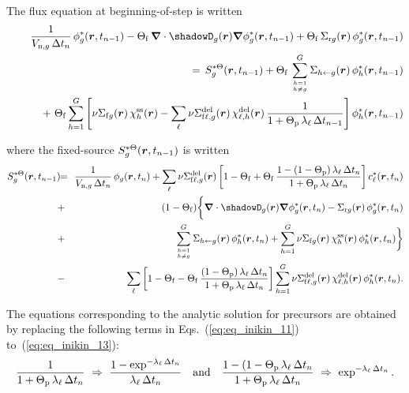 \goodbreak
The flux equation at beginning-of-step is written
\begin{eqnarray}
\nonumber&~&{1\over V_{{\rm n},g}\, \Delta t_n} \, \phi^*_g(\bff(r),t_{n-1}) - \Theta_{\rm f} \, \bff(\nabla) \cdot \shadowD_g(\bff(r)) \bff(\nabla) \phi^*_g(\bff(r),t_{n-1}) + \Theta_{\rm f} \, \Sigma_{{\rm r}g}(\bff(r)) \, \phi^*_g(\bff(r),t_{n-1}) \\
\nonumber&~& \ \ \ \ \ \ = \, S_g^{*\Theta}(\bff(r),t_{n-1})+ \Theta_{\rm f} \, \sum_{{h=1} \atop {h \not= g}}^G \Sigma_{h \leftarrow g}(\bff(r)) \, \phi^*_h(\bff(r),t_{n-1})\\
&~& \ \ \ \ \ \ + \ \Theta_{\rm f}\sum_{h=1}^G \left[\nu\Sigma_{{\rm f}g}(\bff(r))\, \chi_h^{\rm ss}(\bff(r)) - \sum_\ell \nu\Sigma_{{\rm f}\ell,g}^{\rm del}(\bff(r))\,\chi_{\ell,h}^{\rm del}(\bff(r))
\, {1 \over 1+\Theta_{\rm p} \, \lambda_\ell\, \Delta t_{n-1}}\right] \phi^*_h(\bff(r),t_{n-1})
\label{eq:eq_inikin_12}
\end{eqnarray}

\noindent where the fixed-source $S_g^{*\Theta}(\bff(r),t_{n-1})$ is written
\begin{eqnarray}
\nonumber S_g^{*\Theta}(\bff(r),t_{n-1})\negthinspace\negthinspace&=&\negthinspace\negthinspace{1\over V_{{\rm n},g}\, \Delta t_n} \,\phi_g(\bff(r),t_{n}) + \sum_\ell \nu\Sigma_{{\rm f}\ell,g}^{\rm del}(\bff(r)) \left[ 1- \Theta_{\rm f}+ \Theta_{\rm f} \,  {1-(1- \Theta_{\rm p}) \, \lambda_\ell \, \Delta t_n \over 1+ \Theta_{\rm p}\, \lambda_\ell \, \Delta t_n }\right] c^*_\ell(\bff(r),t_{n})\\
\nonumber &+& \negthinspace\negthinspace(1- \Theta_{\rm f})\bigg\{\bff(\nabla) \cdot \shadowD_g(\bff(r)) \bff(\nabla) \phi^*_g(\bff(r),t_{n}) - \Sigma_{{\rm r}g}(\bff(r)) \, \phi^*_g(\bff(r),t_{n}) \\
\nonumber&+&\negthinspace\negthinspace \sum_{{h=1} \atop {h \not= g}}^G \Sigma_{h \leftarrow g}(\bff(r)) \, \phi^*_h(\bff(r),t_{n})+ \sum_{h=1}^G \nu\Sigma_{{\rm f}g}(\bff(r))\, \chi_h^{\rm ss}(\bff(r)) \, \phi^*_h(\bff(r),t_{n}) \bigg\} \\
&-& \negthinspace\negthinspace \sum_\ell \left[1- \Theta_{\rm f}- \Theta_{\rm f} \, {(1- \Theta_{\rm p}) \, \lambda_\ell \, \Delta t_n \over 1+ \Theta_{\rm p}\, \lambda_\ell \, \Delta t_n } \right] \sum_{h=1}^G \nu\Sigma_{{\rm f}\ell,g}^{\rm del}(\bff(r))\,\chi_{\ell,h}^{\rm del}(\bff(r)) \, \phi^*_h(\bff(r),t_{n}) .
\label{eq:eq_inikin_13}
\end{eqnarray}

The equations corresponding to the analytic solution for precursors are obtained by replacing the following terms in Eqs.~(\ref{eq:eq_inikin_11}) to~(\ref{eq:eq_inikin_13}):
\begin{equation}
{1\over 1+ \Theta_{\rm p}\, \lambda_\ell \, \Delta t_n} \ \Rightarrow \ {1-\exp^{-\lambda_\ell \, \Delta t_n} \over \lambda_\ell \, \Delta t_n} \ \ \ {\rm and} \ \ \
{1-(1-\Theta_{\rm p}\,\lambda_\ell \, \Delta t_n \over 1+ \Theta_{\rm p}\, \lambda_\ell \, \Delta t_n} \ \Rightarrow \ \exp^{-\lambda_\ell \, \Delta t_n} .
\label{eq:eq_inikin_14}
\end{equation}
\goodbreak

